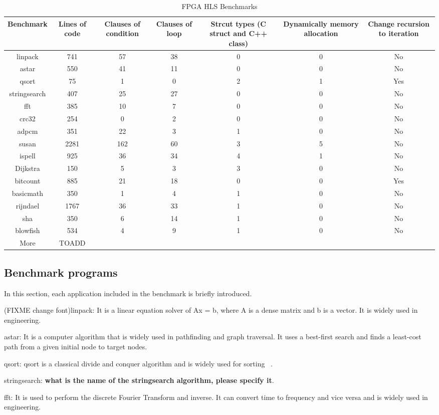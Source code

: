 \documentclass[conference]{IEEEtran}
\begin{document}
\begin{table}[!t]
\caption{FPGA HLS Benchmarks}\label{table_benchmark2}
\begin{tabular}{|c|c|c|c|c|c|c|}
\hline
Benchmark  & Lines of code & Clauses of condition & Clauses of loop & Strcut types (C struct and C++ class) & Dynamically memory allocation & Change recursion to iteration\tabularnewline
\hline
\hline
linpack & 741 & 57 & 38 & 0 & 0 & No\tabularnewline
\hline
astar & 550 & 41 & 11 & 0 & 0 & No\tabularnewline
\hline
qsort & 75 & 1 & 0 & 2 & 1 & Yes\tabularnewline
\hline
stringsearch & 407 & 25 & 27 & 0 & 0 & No\tabularnewline
\hline
fft & 385 & 10 & 7 & 0 & 0 & No\tabularnewline
\hline
crc32 & 254 & 0 & 2 & 0 & 0 & No\tabularnewline
\hline
adpcm  & 351 & 22 & 3 & 1 & 0 & No\tabularnewline
\hline
susan & 2281 & 162 & 60 & 3 & 5 & No\tabularnewline
\hline
ispell & 925 & 36 & 34 & 4 & 1 & No\tabularnewline
\hline
Dijkstra & 150 & 5 & 3 & 3 & 0 & No\tabularnewline
\hline
bitcount & 885 & 21 & 18 & 0 & 0 & Yes\tabularnewline
\hline
basicmath & 350 & 1 & 4 & 1 & 0 & No\tabularnewline
\hline
rijndael & 1767 & 36 & 33 & 1 & 0 & No\tabularnewline
\hline
sha & 350 & 6 & 14 & 1 & 0 & No\tabularnewline
\hline
blowfish & 534 & 4 & 9 & 1 & 0 & No\tabularnewline
\hline
More & TOADD &  &  &  &  & \tabularnewline
\hline
\end{tabular}

\end{table}


\subsection{Benchmark programs}
In this section, each application included in the benchmark is briefly introduced.

(FIXME change font)linpack: It is a linear equation solver of Ax = b, where A is a dense matrix and b is a vector. It is widely used in engineering.

astar: It is a computer algorithm that is widely used in pathfinding and graph traversal. It uses a best-first search and finds a least-cost path from a given initial node to target nodes.

qsort: qsort is a classical divide and conquer algorithm and is widely used for sorting ~\cite{guthaus2001mibench}.

stringsearch: \textbf{what is the name of the stringsearch algorithm, please specify it}.

fft: It is used to perform the discrete Fourier Transform and inverse. It can convert time to frequency and vice versa and is widely used in engineering.
\end{document}
